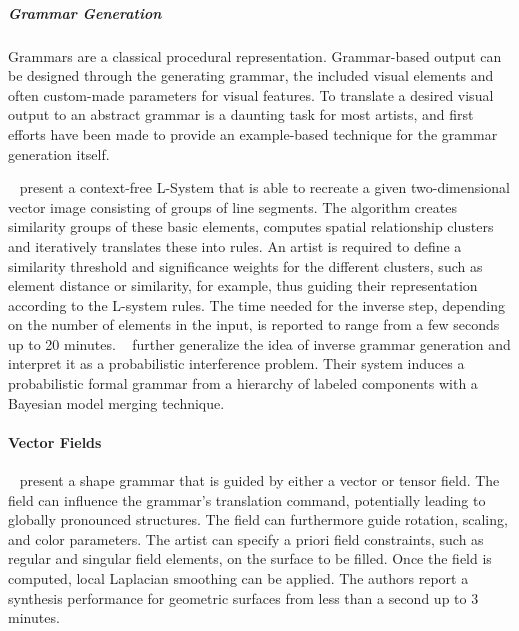 \subparagraph{Grammar Generation}
\label{subpara:analysis_rulebased_shapes_grammar}

Grammars are a classical procedural representation. Grammar-based output can be designed through the generating grammar, the included visual elements and often custom-made parameters for visual features. To translate a desired visual output to an abstract grammar is a daunting task for most artists, and first efforts have been made to provide an example-based technique for the grammar generation itself.

\citeauthor*{stava_2010_ipm}~\cite{stava_2010_ipm} present a context-free L-System that is able to recreate a given two-dimensional vector image consisting of groups of line segments. The algorithm creates similarity groups of these basic elements, computes spatial relationship clusters and iteratively translates these into rules. An artist is required to define a similarity threshold and significance weights for the different clusters, such as element distance or similarity, for example, thus guiding their representation according to the L-system rules. The time needed for the inverse step, depending on the number of elements in the input, is reported to range from a few seconds up to 20 minutes. \citeauthor*{talton_2012_ldp}~\cite{talton_2012_ldp} further generalize the idea of inverse grammar generation and interpret it as a probabilistic interference problem. Their system induces a probabilistic formal grammar from a hierarchy of labeled components with a Bayesian model merging technique.

\paragraph{Vector Fields}
\label{para:analysis_rulebased_vector_fields}

\citeauthor*{yuanyuan_2011_gso}~\cite{yuanyuan_2011_gso} present a shape grammar that is guided by either a vector or tensor field. The field can influence the grammar's translation command, potentially leading to globally pronounced structures. The field can furthermore guide rotation, scaling, and color parameters. The artist can specify a priori field constraints, such as regular and singular field elements, on the surface to be filled. Once the field is computed, local Laplacian smoothing can be applied. The authors report a synthesis performance for geometric surfaces from less than a second up to 3 minutes.

